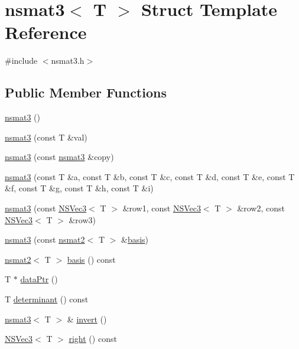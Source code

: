 \hypertarget{structnsmat3}{\section{nsmat3$<$ T $>$ Struct Template Reference}
\label{structnsmat3}
}


{\ttfamily \#include $<$nsmat3.\-h$>$}

\subsection*{Public Member Functions}
\begin{DoxyCompactItemize}
\item 
\hyperlink{structnsmat3_aaa437144381401285449890554174b11}{nsmat3} ()
\item 
\hyperlink{structnsmat3_ab50e968821209f1f78759f3b4e097a3a}{nsmat3} (const T \&val)
\item 
\hyperlink{structnsmat3_a7d2ee94831be7404ad363eb320a394b8}{nsmat3} (const \hyperlink{structnsmat3}{nsmat3} \&copy)
\item 
\hyperlink{structnsmat3_aed0e0485fa16e87edb3204f443f65828}{nsmat3} (const T \&a, const T \&b, const T \&c, const T \&d, const T \&e, const T \&f, const T \&g, const T \&h, const T \&i)
\item 
\hyperlink{structnsmat3_a15a2ea4d714c91906cf2b98c65cb77ab}{nsmat3} (const \hyperlink{structNSVec3}{N\-S\-Vec3}$<$ T $>$ \&row1, const \hyperlink{structNSVec3}{N\-S\-Vec3}$<$ T $>$ \&row2, const \hyperlink{structNSVec3}{N\-S\-Vec3}$<$ T $>$ \&row3)
\item 
\hyperlink{structnsmat3_aa6b3ee11411217dac7c384ff54f07a5e}{nsmat3} (const \hyperlink{structnsmat2}{nsmat2}$<$ T $>$ \&\hyperlink{structnsmat3_ab4f290c5d4071a2f54ad98481769fa81}{basis})
\item 
\hyperlink{structnsmat2}{nsmat2}$<$ T $>$ \hyperlink{structnsmat3_ab4f290c5d4071a2f54ad98481769fa81}{basis} () const 
\item 
T $\ast$ \hyperlink{structnsmat3_a270f0e4ae75b8d1f81ea33184963a701}{data\-Ptr} ()
\item 
T \hyperlink{structnsmat3_aafdc78dfc8c8e9aa3c82d5547ac569e4}{determinant} () const 
\item 
\hyperlink{structnsmat3}{nsmat3}$<$ T $>$ \& \hyperlink{structnsmat3_a7e0988cff451dec5be450a2ded2ad6d8}{invert} ()
\item 
\hyperlink{structNSVec3}{N\-S\-Vec3}$<$ T $>$ \hyperlink{structnsmat3_a8654ae63862ad630ba291113fdccda1c}{right} () const 

\end{DoxyCompactItemize}
